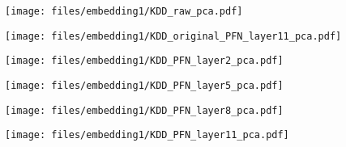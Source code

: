 \begin{figure*}[t]
    \begin{minipage}{0.16\linewidth}
    \texttt{[image: files/embedding1/KDD\_raw\_pca.pdf]}
    \centering
    \end{minipage}
    \begin{minipage}{0.16\linewidth}
    \texttt{[image: files/embedding1/KDD\_original\_PFN\_layer11\_pca.pdf]}
    \centering
    \end{minipage}
    \begin{minipage}{0.16\linewidth}
    \texttt{[image: files/embedding1/KDD\_PFN\_layer2\_pca.pdf]}
    \centering
    \end{minipage}
    \begin{minipage}{0.16\linewidth}
    \texttt{[image: files/embedding1/KDD\_PFN\_layer5\_pca.pdf]}
    \centering
    \end{minipage}
    \begin{minipage}{0.16\linewidth}
    \texttt{[image: files/embedding1/KDD\_PFN\_layer8\_pca.pdf]}
    \centering
    \end{minipage}
    \begin{minipage}{0.16\linewidth}
    \texttt{[image: files/embedding1/KDD\_PFN\_layer11\_pca.pdf]}
    \centering
    \end{minipage}
    

\end{figure*}
